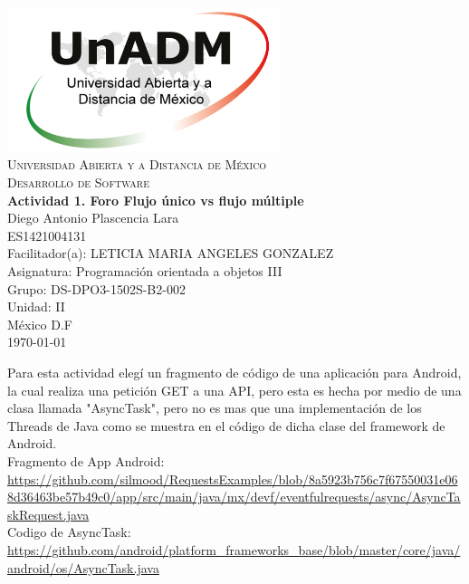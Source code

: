 \documentclass[spanish,12pt,letterpapper]{article}
\begin{document}
	\begin{titlepage}
		\begin{center}
			\includegraphics[width=0.6\textwidth]{../logoUnADM}~\\[1cm] 
			\textsc{Universidad Abierta y a Distancia de México}\\[0.8cm]
			\textsc{Desarrollo de Software}\\[1.8cm]
			
			\textbf{ \Large Actividad 1. Foro Flujo único vs flujo múltiple}\\[3cm]
			
			Diego Antonio Plascencia Lara\\ ES1421004131 \\[0.4cm]
			Facilitador(a): LETICIA MARIA ANGELES GONZALEZ\\
			Asignatura: Programación orientada a objetos III\\
			Grupo: DS-DPO3-1502S-B2-002 \\
			Unidad: II \\
			
			\vfill México D.F\\{\today}
			
		\end{center}
	\end{titlepage}
	
	Para esta actividad elegí un fragmento de código de una aplicación para Android, la cual realiza una petición GET a una API, pero esta es hecha por medio de una clasa llamada "AsyncTask", pero no es mas que una implementación de los Threads de Java como se muestra en el código de dicha clase del framework de Android.\\
	
	Fragmento de App Android:\\
	\url{https://github.com/silmood/RequestsExamples/blob/8a5923b756c7f67550031e068d36463be57b49c0/app/src/main/java/mx/devf/eventfulrequests/async/AsyncTaskRequest.java}\\
	
	Codigo de AsyncTask:\\ \url{https://github.com/android/platform_frameworks_base/blob/master/core/java/android/os/AsyncTask.java}\\
	
\end{document}

